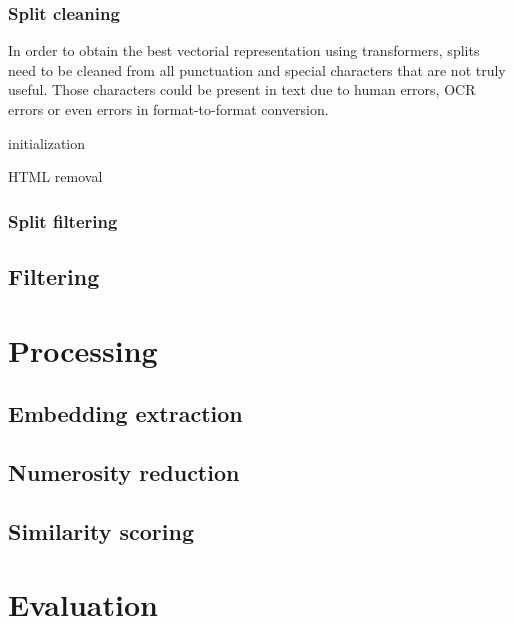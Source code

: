\documentclass[\main/main.tex]{subfiles}
\begin{document}
\subsubsection{Split cleaning}
In order to obtain the best vectorial representation using transformers, splits need to be cleaned from all punctuation and special characters that are not truly useful. Those characters could be present in text due to human errors, OCR errors or even errors in format-to-format conversion.
\begin{center}
    \begin{algorithm}[H]
     initialization\;
     \caption{HTML removal}
    \end{algorithm}
\end{center}
\subsubsection{Split filtering}

\subsection{Filtering}

\section{Processing}
\subsection{Embedding extraction}
\subsection{Numerosity reduction}
\subsection{Similarity scoring}
\section{Evaluation}
\end{document}
